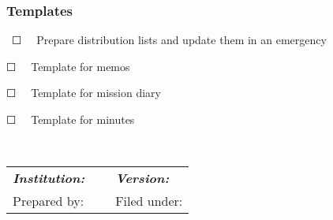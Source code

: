 \documentclass{article}
\begin{document}
\subsubsection{Templates}\label{H1955050}



 ☐   Prepare distribution lists and update them in an emergency


☐   Template for memos


☐   Template for mission diary


☐   Template for minutes


 


\begin{tabu} to \textwidth { |X|X|X| }
\hline



\emph{\textbf{Institution:}} &  & \emph{\textbf{Version:}}
 \\


Prepared by:  &  & Filed under:
 \\
\hline

\end{tabu}

                                                           
\end{document}
